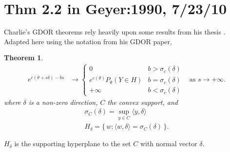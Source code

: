 \documentclass{amsbook}
\newcommand{\set}[1]{\{\,#1\,\}}
\newcommand{\inner}[1]{\langle #1 \rangle}
\newtheorem{theorem}{Theorem}
\theoremstyle{definition}
\theoremstyle{remark}
\begin{document}
\section{Thm 2.2 in Geyer:1990, 7/23/10}
Charlie's GDOR theorems rely heavily upon some results from his thesis \citep{Geyer:
1990}.  Adapted here 
using the notation from his GDOR paper,
\begin{theorem}
\begin{align*}
e^{c(\theta + s \delta) - bs} &\to 
		\begin{cases} 
			0 								& b > \sigma_c(\delta) \\
			e^{c(\theta)} P_\theta(Y \in H ) 	& b = \sigma_c(\delta) \\
			+\infty							& b < \sigma_c(\delta)
		\end{cases}
& \text{as } s \to +\infty.
\end{align*}
where $\delta$ is a non-zero direction, $C$ the convex support, and
\begin{align*}
	\sigma_C (\delta) = \sup_{y \in C} \inner{ y, \delta} \\
	H_\delta = \set{w: \inner{w, \delta} = \sigma_C(\delta) }.
\end{align*}
\end{theorem}
$H_\delta$ is the supporting hyperplane to the set $C$ with normal vector $\delta$.
\end{document}
